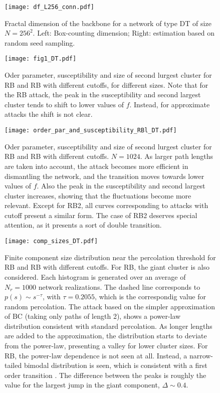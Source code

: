 \documentclass{article}
\begin{document}
\begin{figure}
\centering
\texttt{[image: df\_L256\_conn.pdf]}
\caption{\label{fig:fractal_dimension_backbone} Fractal dimension of the backbone for a network of type DT of size $N=256^2$. Left: Box-counting dimension; Right: estimation based on random seed sampling.}
\end{figure}




\begin{figure}
\centering
\texttt{[image: fig1\_DT.pdf]}
\caption{Oder parameter, susceptibility and size of second lurgest cluster for RB and RB with different cutoffs, for different sizes. Note that for the RB attack, the peak in the susceptibility and second largest cluster tends to shift to lower values of $f$. Instead, for approximate attacks the shift is not clear.}
\end{figure}

\begin{figure}
\centering
\texttt{[image: order\_par\_and\_susceptibility\_RBl\_DT.pdf]}
\caption{Oder parameter, susceptibility and size of second lurgest cluster for RB and RB with different cutoffs. $N = 1024$. As larger path lengths are taken into account, the attack becomes more efficient in dismantling the network, and the transition moves towards lower values of $f$. Also the peak in the susceptibility and second largest cluster increases, showing that the fluctuations become more relevant. Except for RB2, all curves corresponding to attacks with cutoff present a similar form. The case of RB2 deserves special attention, as it presents a sort of double transition.}
\end{figure}



\begin{figure}
\centering
\texttt{[image: comp\_sizes\_DT.pdf]}
\caption{Finite component size distribution near the percolation threshold for RB and RB with different cutoffs. For RB, the giant cluster is also considered. Each histogram is generated over an average of $N_r = 1000$ network realizations. The dashed line corresponds to $p(s) \sim s^{-\tau}$, with $\tau = 0.2055$, which is the correspondig value for random percolation. The attack based on the simpler approximation of BC (taking only paths of length 2), shows a power-law distribution consistent with standard percolation. As longer lengths are added to the approximation, the distribution starts to deviate from the power-law, presenting a valley for lower cluster sizes. For RB, the power-law dependence is not seen at all. Instead, a narrow-tailed bimodal distribution is seen, which is consistent with a first order transition \cite{Araujo2010,Binder1992} . The difference between the peaks is roughly the value for the largest jump in the giant component, $\Delta\sim 0.4$. }
\end{figure}
\end{document}
